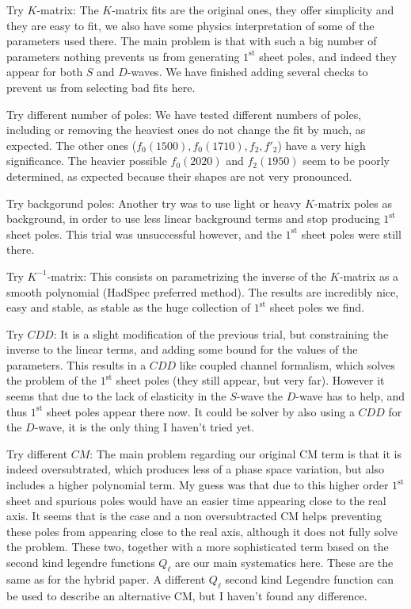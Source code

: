 \begin{todolist}
  \item[\done] Try $K$-matrix:
  The $K$-matrix fits are the original ones, they offer simplicity and they are easy to fit, we also have some physics interpretation of some of the parameters used there. The main problem is that with such a big number of parameters nothing prevents us from generating $1^\text{st}$ sheet poles, and indeed they appear for both $S$ and $D$-waves. We have finished adding several checks to prevent us from selecting bad fits here.
  \item[\done] Try different number of poles:
  We have tested different numbers of poles, including or removing the heaviest ones do not change the fit by much, as expected. The other ones ($f_0(1500),f_0(1710),f_2,f'_2$) have a very high significance. The heavier possible $f_0(2020)$ and $f_2(1950)$ seem to be poorly determined, as expected because their shapes are not very pronounced.
  \item[\done] Try backgorund poles:
  Another try was to use light or heavy $K$-matrix poles as background, in order to use less linear background terms and stop producing $1^\text{st}$ sheet poles. This trial was unsuccessful however, and the $1^\text{st}$ sheet poles were still there.
  \item[\done] Try $K^{-1}$-matrix:
  This consists on parametrizing the inverse of the $K$-matrix as a smooth polynomial (HadSpec preferred method). The results are incredibly nice, easy and stable, as stable as the huge collection of $1^\text{st}$ sheet poles we find.
  \item[\done] Try $CDD$:
  It is a slight modification of the previous trial, but constraining the inverse to the linear terms, and adding some bound for the values of the parameters. This results in a $CDD$ like coupled channel formalism, which solves the problem of the $1^\text{st}$ sheet poles (they still appear, but very far). However it seems that due to the lack of elasticity in the $S$-wave the $D$-wave has to help, and thus $1^\text{st}$ sheet poles appear there now. It could be solver by also using a $CDD$ for the $D$-wave, it is the only thing I haven't tried yet. 
  \item[\done] Try different $CM$:
  The main problem regarding our original CM term is that it is indeed oversubtrated, which produces less of a phase space variation, but also includes a higher polynomial term. My guess was that due to this higher order $1^\text{st}$ sheet and spurious poles would have an easier time appearing close to the real axis. It seems that is the case and a non oversubtracted CM helps preventing these poles from appearing close to the real axis, although it does not fully solve the problem. These two, together with a more sophisticated term based on the second kind legendre functions $Q_\ell$ are our main systematics here. These are the same as for the hybrid paper. A different $Q_\ell$ second kind Legendre function can be used to describe an alternative CM, but I haven't found any difference.

\end{todolist}
